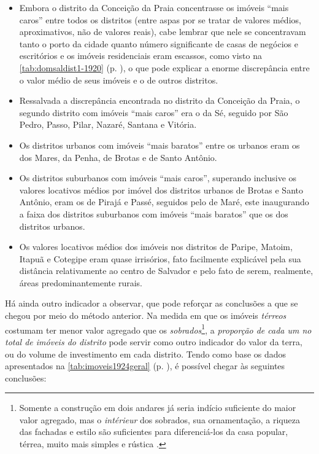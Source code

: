 

\begin{itemize}
\item Embora o distrito da Conceição da Praia concentrasse os imóveis ``mais caros'' entre todos os distritos (entre aspas por se tratar de valores médios, aproximativos, não de valores reais), cabe lembrar que nele se concentravam tanto o porto da cidade quanto número significante de casas de negócios e escritórios e os imóveis residenciais eram escassos, como visto na \autoref{tab:domsaldist1-1920} (p. \pageref{tab:domsaldist1-1920}), o que pode explicar a enorme discrepância entre o valor médio de seus imóveis e o de outros distritos.
\item Ressalvada a discrepância encontrada no distrito da Conceição da Praia, o segundo distrito com imóveis ``mais caros'' era o da Sé, seguido por São Pedro, Passo, Pilar, Nazaré, Santana e Vitória.
\item Os distritos urbanos com imóveis ``mais baratos'' entre os urbanos eram os dos Mares, da Penha, de Brotas e de Santo Antônio.
\item Os distritos suburbanos com imóveis ``mais caros'', superando inclusive os valores locativos médios por imóvel dos distritos urbanos de Brotas e Santo Antônio, eram os de Pirajá e Passé, seguidos pelo de Maré, este inaugurando a faixa dos distritos suburbanos com imóveis ``mais baratos'' que os dos distritos urbanos.
\item Os valores locativos médios dos imóveis nos distritos de Paripe, Matoim, Itapuã e Cotegipe eram quase irrisórios, fato facilmente explicável pela sua distância relativamente ao centro de Salvador e pelo fato de serem, realmente, áreas predominantemente rurais.
\end{itemize}

Há ainda outro indicador a observar, que pode reforçar as conclusões a que se chegou por meio do método anterior. Na medida em que os imóveis \textit{térreos} costumam ter menor valor agregado que os \textit{sobrados}\footnote{Somente a construção em dois andares já seria indício suficiente do maior valor agregado, mas o \textit{intérieur} dos sobrados, sua ornamentação, a riqueza das fachadas e estilo são suficientes para diferenciá-los da casa popular, térrea, muito mais simples e rústica \cite[pp.~87-111]{ott_formaet1_1955}.}, a \textit{proporção de cada um no total de imóveis do distrito} pode servir como outro indicador do valor da terra, ou do volume de investimento em cada distrito. Tendo como base os dados apresentados na \autoref{tab:imoveis1924geral} (p. \pageref{tab:imoveis1924geral}), é possível chegar às seguintes conclusões:

